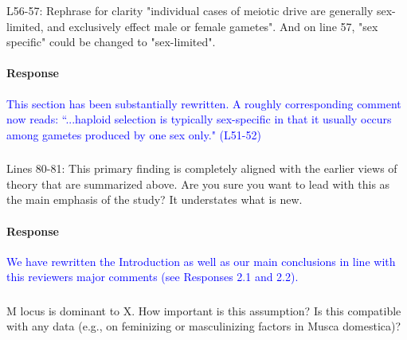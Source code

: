 \documentclass[10pt,letterpaper]{article}
\begin{document}
\noindent\subsubsection{}
L56-57: Rephrase for clarity "individual cases of meiotic drive are generally sex-limited, and exclusively effect male or female gametes". And on line 57, "sex specific" could be changed to "sex-limited".

\noindent\paragraph{Response}
\textcolor{blue}{This section has been substantially rewritten. A roughly corresponding comment now reads: ``...haploid selection is typically sex-specific in that it usually occurs among gametes produced by one sex only." (L51-52)}

\noindent\subsubsection{}
Lines 80-81: This primary finding is completely aligned with the earlier views of theory that are summarized above. Are you sure you want to lead with this as the main emphasis of the study? It understates what is new.

\noindent\paragraph{Response}
\textcolor{blue}{We have rewritten the Introduction as well as our main conclusions in line with this reviewers major comments (see Responses 2.1 and 2.2).}

\noindent\subsubsection{}
M locus is dominant to X. How important is this assumption? Is this compatible with any data (e.g., on feminizing or masculinizing factors in Musca domestica)?
\end{document}
